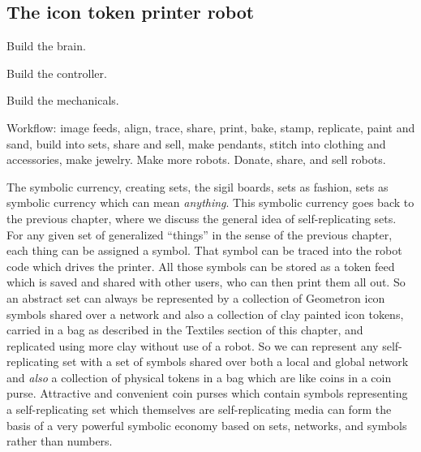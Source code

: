 \subsection{The icon token printer robot}

Build the brain. 

Build the controller. 

Build the mechanicals.  

Workflow:  image feeds, align, trace, share, print, bake, stamp, replicate, paint and sand, build into sets, share and sell, make pendants, stitch into clothing and accessories, make jewelry. Make more robots. Donate, share, and sell robots. 

The symbolic currency, creating sets, the sigil boards, sets as fashion, sets as symbolic currency which can mean \emph{anything}.  This symbolic currency goes back to the previous chapter, where we discuss the general idea of self-replicating sets. For any given set of generalized ``things'' in the sense of the previous chapter, each thing can be assigned a symbol.  That symbol can be traced into the robot code which drives the printer.  All those symbols can be stored as a token feed which is saved and shared with other users, who can then print them all out.  So an abstract set can always be represented by a collection of Geometron icon symbols shared over a network and also a collection of clay painted icon tokens, carried in a bag as described in the Textiles section of this chapter, and replicated using more clay without use of a robot.  So we can represent any self-replicating set with a set of symbols shared over both a local and global network and \emph{also} a collection of physical tokens in a bag which are like coins in a coin purse. Attractive and convenient coin purses which contain symbols representing a self-replicating set which themselves are self-replicating media can form the basis of a very powerful symbolic economy based on sets, networks, and symbols rather than numbers.  

